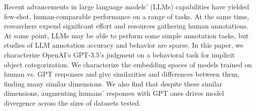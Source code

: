 Recent advancements in large language models' (LLMs) capabilities have yielded few-shot, human-comparable performance on a range of tasks. At the same time, researchers expend significant effort and resources gathering human annotations.  At some point, LLMs may be able to perform some simple annotation tasks, but studies of LLM annotation accuracy and behavior are sparse. In this paper, we characterize OpenAI's GPT-3.5's judgment on a behavioral task for implicit object categorization. We characterize the embedding spaces of models trained on human vs. GPT responses and give similarities and differences between them, finding many similar dimensions. We also find that despite these similar dimensions, augmenting humans' responses with GPT ones drives model divergence across the sizes of datasets tested.
